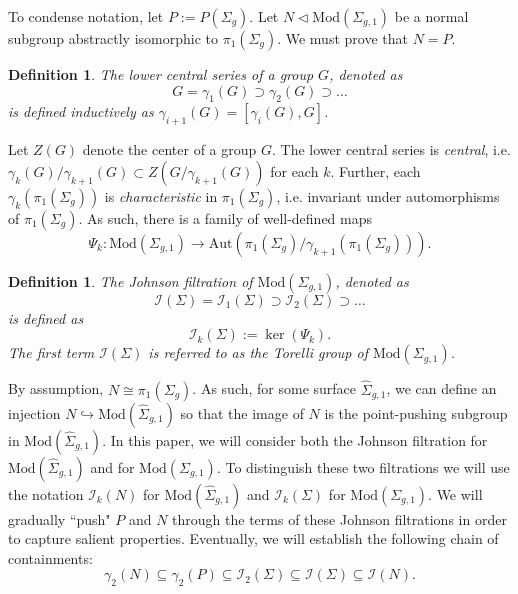 \documentclass[a4paper]{amsproc}
\theoremstyle{TheoremNum}
\theoremstyle{Theorembold}
\theoremstyle{TheoremboldDef}
\newtheorem{dfn}[thm]{Definition}
\theoremstyle{TheoremboldRem}
\theoremstyle{TheoremboldRem}
\begin{document}
 To condense notation, let $P:=P({\Sigma_{g}})$. Let $N\triangleleft{\text{Mod}(\Sigma_{g,1})}$ be a normal subgroup abstractly isomorphic to ${\pi_1(\Sigma_g)}$. We must prove that $N=P$.\\
 
 
  \begin{dfn}\label{lcs}
 The \emph{lower central series} of a group $G$, denoted as \[G=\gamma_1(G)\supset\gamma_2(G)\supset\dots\] is defined inductively as $\gamma_{i+1}(G)=[\gamma_i(G),G]$.
  \end{dfn}
  Let $Z(G)$ denote the center of a group $G$. The lower central series is \emph{central}, i.e. $\gamma_k(G)/\gamma_{k+1}(G)\subset Z(G/\gamma_{k+1}(G))$ for each $k$. Further, each $\gamma_k({\pi_1(\Sigma_g)})$ is \emph{characteristic} in ${\pi_1(\Sigma_g)}$, i.e. invariant under automorphisms of ${\pi_1(\Sigma_g)}$. As such, there is a family of well-defined maps \[\Psi_k:{\text{Mod}(\Sigma_{g,1})}\to\text{Aut}({\pi_1(\Sigma_g)}/\gamma_{k+1}({\pi_1(\Sigma_g)})).\]
   \begin{dfn}\label{torelli}
 The \emph{Johnson filtration} of ${\text{Mod}(\Sigma_{g,1})}$, denoted as \[{{\mathcal{I}}(\Sigma)}={\mathcal{I}}_1(\Sigma)\supset{{\mathcal{I}}_2(\Sigma)}\supset\dots\] is defined as \[{{\mathcal{I}}_k(\Sigma)}:=\ker(\Psi_k).\]  The first term ${{\mathcal{I}}(\Sigma)}$ is referred to as the \emph{Torelli group} of ${\text{Mod}(\Sigma_{g,1})}$. 
  \end{dfn}
   
 By assumption, $N\cong{\pi_1(\Sigma_g)}$. As such, for some surface $\hat{\Sigma}_{g,1}$, we can define an injection $N\hookrightarrow{\text{Mod}(\hat{\Sigma}_{g,1})}$ so that the image of $N$ is the point-pushing subgroup in ${\text{Mod}(\hat{\Sigma}_{g,1})}$. In this paper, we will consider both the Johnson filtration for ${\text{Mod}(\hat{\Sigma}_{g,1})}$ and for ${\text{Mod}(\Sigma_{g,1})}$. To distinguish these two filtrations we will use the notation ${{\mathcal{I}}_k(N)}$ for ${\text{Mod}(\hat{\Sigma}_{g,1})}$ and ${{\mathcal{I}}_k(\Sigma)}$ for ${\text{Mod}(\Sigma_{g,1})}$.  We will gradually ``push" $P$ and $N$ through the terms of these Johnson filtrations in order to capture salient properties. Eventually, we will establish the following chain of containments:
   \[\gamma_2(N)\subseteq\gamma_2(P)\subseteq{{\mathcal{I}}_2(\Sigma)}\subseteq{{\mathcal{I}}(\Sigma)}\subseteq{{\mathcal{I}}(N)}.\]  
 
   
\end{document}
